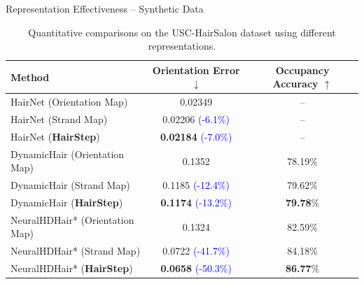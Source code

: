 \begin{frame}[t]{Representation Effectiveness -- Synthetic Data}
    \begin{table}[h]
        \centering
        \small
        \renewcommand{\arraystretch}{1.2}
        \begin{tabular}{l|c|c}
            \hline
            \rowcolor{myLightBlue}
            Method & Orientation Error $\downarrow$ & Occupancy Accuracy $\uparrow$ \\
            \hline
            HairNet (Orientation Map) & 0.02349 & -- \\
            HairNet (Strand Map) & 0.02206 \textcolor{blue}{(-6.1\%)} & -- \\
            HairNet (\textbf{HairStep}) & \textbf{0.02184} \textcolor{blue}{(-7.0\%)} & -- \\
            \midrule
            DynamicHair (Orientation Map) & 0.1352 & 78.19$\%$ \\
            DynamicHair (Strand Map) & 0.1185 \textcolor{blue}{(-12.4\%)} & 79.62$\%$ \\
            DynamicHair (\textbf{HairStep}) & \textbf{0.1174} \textcolor{blue}{(-13.2\%)} & \textbf{79.78$\%$} \\
            \midrule
            NeuralHDHair* (Orientation Map) & 0.1324 & 82.59$\%$ \\
            NeuralHDHair* (Strand Map) & 0.0722 \textcolor{blue}{(-41.7\%)} & 84.18$\%$ \\
            NeuralHDHair* (\textbf{HairStep}) & \textbf{0.0658} \textcolor{blue}{(-50.3\%)} & \textbf{86.77$\%$} \\
            \bottomrule
        \end{tabular}
        \caption{Quantitative comparisons on the USC-HairSalon dataset using different representations.}
        \label{tab:representation_effectiveness_synthetic}
    \end{table}
\end{frame}

